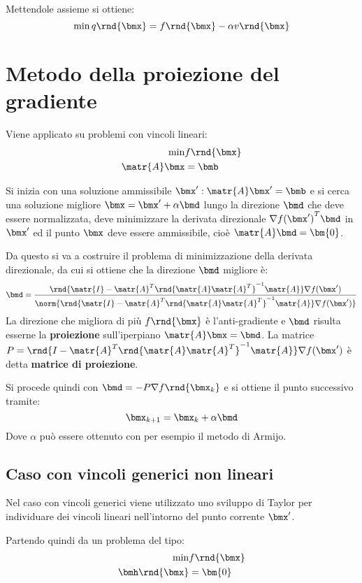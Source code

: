 \documentclass[\main/main.tex]{subfiles}
\begin{document}
Mettendole assieme si ottiene:\[
    \min q\rnd{\bmx} = f\rnd{\bmx} - \alpha v\rnd{\bmx}
\]
\clearpage
\section{Metodo della proiezione del gradiente}
Viene applicato su problemi con vincoli lineari:\begin{align*}
    \min &f\rnd{\bmx}\\
    \matr{A}\bmx &= \bmb
\end{align*}

Si inizia con una soluzione ammissibile \(\bmx':\matr{A}\bmx' = \bmb \) e si cerca una soluzione migliore \(\bmx = \bmx' + \alpha\bmd \) lungo la direzione \(\bmd \) che deve essere normalizzata, deve minimizzare la derivata direzionale \(\nabla {f(\bmx')}^T\bmd \) in \(\bmx'\) ed il punto \(\bmx \) deve essere ammissibile, cioè \(\matr{A}\bmd = \bm{0}\).

Da questo si va a costruire il problema di minimizzazione della derivata direzionale, da cui si ottiene che la direzione \(\bmd \) migliore è:
\[
    \bmd = \frac{\rnd{\matr{I} - \matr{A}^T\rnd{\matr{A}\matr{A}^T}^{-1}\matr{A}}\nabla f(\bmx')}{\norm{\rnd{\matr{I} - \matr{A}^T\rnd{\matr{A}\matr{A}^T}^{-1}\matr{A}}\nabla f(\bmx')}}
\]
La direzione che migliora di più \(f\rnd{\bmx}\) è l'anti-gradiente e \(\bmd \) risulta esserne la \textbf{proiezione} sull'iperpiano \(\matr{A}\bmx = \bmd \). La matrice \(P = \rnd{I - \matr{A}^T\rnd{\matr{A}\matr{A}^T}^{-1}\matr{A}}\nabla f(\bmx')\) è detta \textbf{matrice di proiezione}.

Si procede quindi con \(\bmd = -P\nabla f\rnd{\bmx_k}\) e si ottiene il punto successivo tramite:
\[
    \bmx_{k+1} = \bmx_k + \alpha\bmd
\]
Dove \(\alpha \) può essere ottenuto con per esempio il metodo di Armijo.

\subsection{Caso con vincoli generici non lineari}
Nel caso con vincoli generici viene utilizzato uno sviluppo di Taylor per individuare dei vincoli lineari nell'intorno del punto corrente \(\bmx'\).

Partendo quindi da un problema del tipo:
\begin{align*}
    \min &f\rnd{\bmx}\\
    \bmh\rnd{\bmx} &= \bm{0}
\end{align*}
\end{document}
